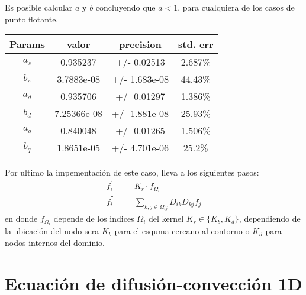 \documentclass[9pt,technote,twoside,letterpaper,onecolumn]{IEEEtran}
\begin{document}
\begin{multicols}{2}
Es posible calcular $a$ y $b$ concluyendo que $a<1$, para cualquiera de los casos de punto flotante.
\begin{center}\scriptsize
\begin{tabular}{ |c|c|c|c| } 
  \hline
  Params & valor & precision & std. err \\
  \hline 
  $a_s$& 0.935237&+/- 0.02513&2.687\%\\
  $b_s$& 3.7883e-08&+/- 1.683e-08&44.43\%\\  \hline
  $a_d$& 0.935706&+/- 0.01297&1.386\%\\
  $b_d$& 7.25366e-08&+/- 1.881e-08&25.93\%\\  \hline
  $a_q$& 0.840048&+/- 0.01265&1.506\%\\
  $b_q$&1.8651e-05&+/- 4.701e-06&25.2\%\\
  \hline
\end{tabular}
\end{center}

Por ultimo la impementación de este caso, lleva a los siguientes pasos:
\begin{align}
  f^{'}_i\,&=\,K_r\cdot f_{\Omega_i}\label{eq:buffdiff}\\
  f^{''}_i\,&=\,\sum_{k,j\in\Omega_{ij}}D_{ik}D_{kj} f_j\label{eq:optimDiff}
\end{align}
en donde $f_{\Omega_i}$ depende de los indices $\Omega_i$ del kernel $K_r\in\{K_b, K_d\}$, dependiendo de la ubicación del nodo sera $K_b$ para el esquma cercano al contorno o $K_d$ para nodos internos del dominio.


\section{Ecuación de difusión-convección 1D}
\label{sec:dif-conv}


\end{multicols}
\end{document}
